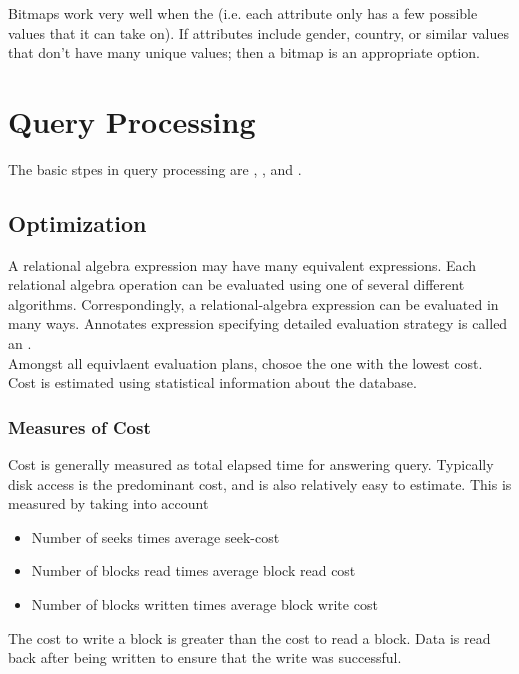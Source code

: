 \documentclass{article}
\begin{document}
\begin{remark}
  Bitmaps work very well when the  (i.e. each attribute only has a few possible values that it can take on). If attributes include gender, country, or similar values that don't have many unique values; then a bitmap is an appropriate option. 
\end{remark}

\section{Query Processing}

The basic stpes in query processing are , , and . 

\subsection{Optimization}

A relational algebra expression may have many equivalent expressions. Each relational algebra operation can be evaluated using one of several different algorithms. Correspondingly, a relational-algebra expression can be evaluated in many ways. Annotates expression specifying detailed evaluation strategy is called an . \\ 

Amongst all equivlaent evaluation plans, chosoe the one with the lowest cost. Cost is estimated using statistical information about the database. 

\subsubsection{Measures of Cost}

Cost is generally measured as total elapsed time for answering query. Typically disk access is the predominant cost, and is also relatively easy to estimate. This is measured by taking into account 
\begin{itemize}
  \item Number of seeks times average seek-cost
  \item Number of blocks read times average block read cost 
  \item Number of blocks written times average block write cost
\end{itemize}

\begin{remark}
  The cost to write a block is greater than the cost to read a block. Data is read back after being written to ensure that the write was successful. 
\end{remark}
\end{document}
